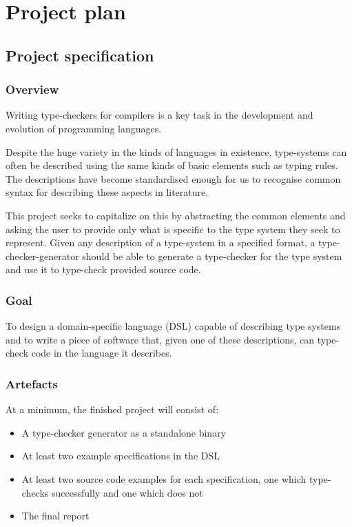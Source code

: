 \chapter{Project plan}

\section{Project specification}

  \subsection{Overview}

  Writing type-checkers for compilers is a key task in the
  development and evolution of programming languages.

  Despite the huge variety in the kinds of languages in existence,
  type-systems can often be described using the same kinds of
  basic elements such as typing rules. The descriptions have become
  standardised enough for us to recognise common syntax for
  describing these aspects in literature.

  This project seeks to capitalize on this by abstracting
  the common elements and asking the user to provide only what is
  specific to the type system they seek to represent. Given any
  description of a type-system in a specified format, a
  type-checker-generator should be able to generate a
  type-checker for the type system and use it to type-check provided
  source code.
  
  \subsection{Goal}

  To design a domain-specific language (DSL) capable of describing type systems and to
  write a piece of software that, given one of these
  descriptions, can type-check code in the language
  it describes.

  \subsection{Artefacts}
  \label{section-artifacts}

  At a minimum, the finished project will consist of:

  \begin{itemize}
  \item A type-checker generator as a standalone binary
  \item At least two example specifications in the DSL
  \item At least two source code examples for each
    specification, one which type-checks successfully and one
    which does not
  \item The final report
  \end{itemize}
  
